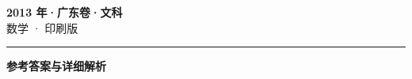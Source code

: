 \documentclass[zihao=5, a4paper]{ctexart}
\begin{document}
\begin{center}
  {\Large\bfseries 2013 年·广东卷·文科}\\[4pt]
  {\large 数学 · 印刷版}
\end{center}
\medskip
{}

\par\bigskip\hrule\bigskip
{}
\Needspace{0.55\textheight}
\begin{center}{\large\bfseries 参考答案与详细解析}\end{center}
\smallskip

\end{document}
